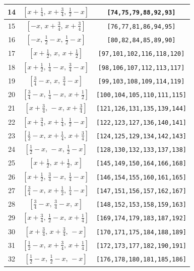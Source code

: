 \documentclass[fleqn,8pt]{jsarticle}
\begin{document}
\begin{longtable}{ccc}
14 & $\left[ x + \frac{1}{4},\, x + \frac{3}{4},\, \frac{1}{2} - x \right]$ & {\tt [74,75,79,88,92,93]} \\ \hline
15 & $\left[ - x,\, x + \frac{3}{4},\, x + \frac{3}{4} \right]$ & {\tt [76,77,81,86,94,95]} \\ \hline
16 & $\left[ - x,\, \frac{1}{2} - x,\, \frac{1}{2} - x \right]$ & {\tt [80,82,84,85,89,90]} \\ \hline
17 & $\left[ x + \frac{1}{2},\, x,\, x + \frac{1}{2} \right]$ & {\tt [97,101,102,116,118,120]} \\ \hline
18 & $\left[ x + \frac{1}{2},\, \frac{1}{4} - x,\, \frac{3}{4} - x \right]$ & {\tt [98,106,107,112,113,117]} \\ \hline
19 & $\left[ \frac{3}{4} - x,\, x,\, \frac{3}{4} - x \right]$ & {\tt [99,103,108,109,114,119]} \\ \hline
20 & $\left[ \frac{3}{4} - x,\, \frac{1}{4} - x,\, x + \frac{1}{2} \right]$ & {\tt [100,104,105,110,111,115]} \\ \hline
21 & $\left[ x + \frac{3}{4},\, - x,\, x + \frac{3}{4} \right]$ & {\tt [121,126,131,135,139,144]} \\ \hline
22 & $\left[ x + \frac{3}{4},\, x + \frac{1}{4},\, \frac{1}{2} - x \right]$ & {\tt [122,123,127,136,140,141]} \\ \hline
23 & $\left[ \frac{1}{2} - x,\, x + \frac{1}{4},\, x + \frac{3}{4} \right]$ & {\tt [124,125,129,134,142,143]} \\ \hline
24 & $\left[ \frac{1}{2} - x,\, - x,\, \frac{1}{2} - x \right]$ & {\tt [128,130,132,133,137,138]} \\ \hline
25 & $\left[ x + \frac{1}{2},\, x + \frac{1}{2},\, x \right]$ & {\tt [145,149,150,164,166,168]} \\ \hline
26 & $\left[ x + \frac{1}{2},\, \frac{3}{4} - x,\, \frac{1}{4} - x \right]$ & {\tt [146,154,155,160,161,165]} \\ \hline
27 & $\left[ \frac{3}{4} - x,\, x + \frac{1}{2},\, \frac{1}{4} - x \right]$ & {\tt [147,151,156,157,162,167]} \\ \hline
28 & $\left[ \frac{3}{4} - x,\, \frac{3}{4} - x,\, x \right]$ & {\tt [148,152,153,158,159,163]} \\ \hline
29 & $\left[ x + \frac{3}{4},\, \frac{1}{2} - x,\, x + \frac{1}{4} \right]$ & {\tt [169,174,179,183,187,192]} \\ \hline
30 & $\left[ x + \frac{3}{4},\, x + \frac{3}{4},\, - x \right]$ & {\tt [170,171,175,184,188,189]} \\ \hline
31 & $\left[ \frac{1}{2} - x,\, x + \frac{3}{4},\, x + \frac{1}{4} \right]$ & {\tt [172,173,177,182,190,191]} \\ \hline
32 & $\left[ \frac{1}{2} - x,\, \frac{1}{2} - x,\, - x \right]$ & {\tt [176,178,180,181,185,186]} \\
\end{longtable}
\end{document}
